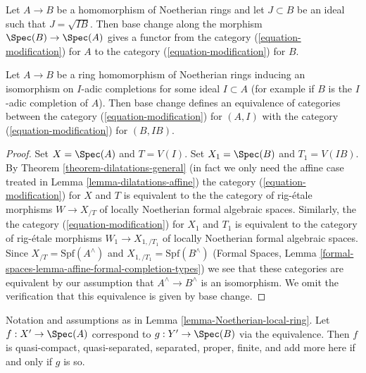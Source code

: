 \medskip\noindent
Let $A \to B$ be a homomorphism of Noetherian rings and let $J \subset B$
be an ideal such that $J = \sqrt{I B}$. Then base
change along the morphism $\Spec(B) \to \Spec(A)$ gives a functor
from the category (\ref{equation-modification}) for $A$
to the category (\ref{equation-modification}) for $B$.

\begin{lemma}
\label{lemma-Noetherian-local-ring}
Let $A \to B$ be a ring homomorphism of Noetherian rings inducing an
isomorphism on $I$-adic completions for some ideal $I \subset A$
(for example if $B$ is the $I$-adic completion of $A$).
Then base change defines an equivalence of categories between the
category (\ref{equation-modification}) for $(A, I)$
with the category (\ref{equation-modification}) for $(B, IB)$.
\end{lemma}

\begin{proof}
Set $X = \Spec(A)$ and $T = V(I)$.
Set $X_1 = \Spec(B)$ and $T_1 = V(IB)$.
By Theorem \ref{theorem-dilatations-general} (in fact we only need
the affine case treated in Lemma \ref{lemma-dilatations-affine})
the category (\ref{equation-modification}) for $X$ and $T$
is equivalent to the the category of rig-\'etale morphisms
$W \to X_{/T}$ of locally Noetherian formal algebraic spaces.
Similarly, the the category (\ref{equation-modification})
for $X_1$ and $T_1$ is equivalent to the category of rig-\'etale
morphisms $W_1 \to X_{1, /T_1}$ of locally Noetherian formal
algebraic spaces. Since $X_{/T} = \text{Spf}(A^\wedge)$
and $X_{1, /T_1} = \text{Spf}(B^\wedge)$ (Formal Spaces, Lemma
\ref{formal-spaces-lemma-affine-formal-completion-types}) we see that
these categories are equivalent by our assumption that
$A^\wedge \to B^\wedge$ is an isomorphism. We omit the verification
that this equivalence is given by base change.
\end{proof}

\begin{lemma}
\label{lemma-Noetherian-local-ring-properties}
Notation and assumptions as in Lemma \ref{lemma-Noetherian-local-ring}.
Let $f : X' \to \Spec(A)$ correspond to $g : Y' \to \Spec(B)$
via the equivalence. Then $f$ is quasi-compact, quasi-separated, separated,
proper, finite, and add more here if and only if $g$ is so.
\end{lemma}

